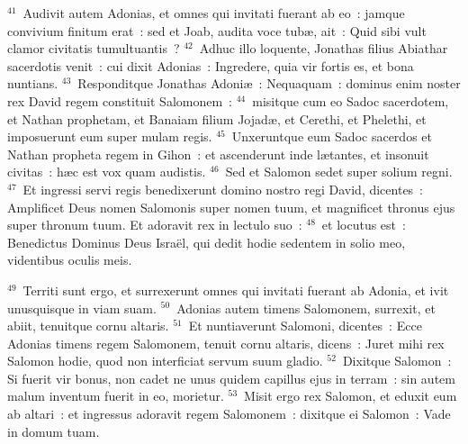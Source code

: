 ${}^{41}$~Audivit autem Adonias, et omnes qui invitati fuerant ab eo~: jamque convivium finitum erat~: sed et Joab, audita voce tub\ae , ait~: Quid sibi vult clamor civitatis tumultuantis~?
${}^{42}$~Adhuc illo loquente, Jonathas filius Abiathar sacerdotis venit~: cui dixit Adonias~: Ingredere, quia vir fortis es, et bona nuntians.
${}^{43}$~Responditque Jonathas Adoni\ae~: Nequaquam~: dominus enim noster rex David regem constituit Salomonem~:
${}^{44}$~misitque cum eo Sadoc sacerdotem, et Nathan prophetam, et Banaiam filium Jojad\ae , et Cerethi, et Phelethi, et imposuerunt eum super mulam regis.
${}^{45}$~Unxeruntque eum Sadoc sacerdos et Nathan propheta regem in Gihon~: et ascenderunt inde l\ae tantes, et insonuit civitas~: h\ae c est vox quam audistis.
${}^{46}$~Sed et Salomon sedet super solium regni.
${}^{47}$~Et ingressi servi regis benedixerunt domino nostro regi David, dicentes~: Amplificet Deus nomen Salomonis super nomen tuum, et magnificet thronus ejus super thronum tuum. Et adoravit rex in lectulo suo~:
${}^{48}$~et locutus est~: Benedictus Dominus Deus Isra\"el, qui dedit hodie sedentem in solio meo, videntibus oculis meis.


${}^{49}$~Territi sunt ergo, et surrexerunt omnes qui invitati fuerant ab Adonia, et ivit unusquisque in viam suam.
${}^{50}$~Adonias autem timens Salomonem, surrexit, et abiit, tenuitque cornu altaris.
${}^{51}$~Et nuntiaverunt Salomoni, dicentes~: Ecce Adonias timens regem Salomonem, tenuit cornu altaris, dicens~: Juret mihi rex Salomon hodie, quod non interficiat servum suum gladio.
${}^{52}$~Dixitque Salomon~: Si fuerit vir bonus, non cadet ne unus quidem capillus ejus in terram~: sin autem malum inventum fuerit in eo, morietur.
${}^{53}$~Misit ergo rex Salomon, et eduxit eum ab altari~: et ingressus adoravit regem Salomonem~: dixitque ei Salomon~: Vade in domum tuam.

